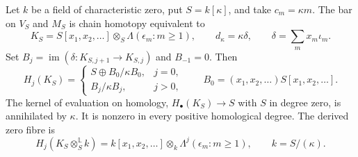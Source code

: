 \begin{theorem}
\label{mbh:thm:family}
Let \(k\) be a field of characteristic zero, put \(S=k[\kappa]\),
and take \(c_m=\kappa m\).  The bar on \(V_S\) and \(M_S\)
is chain homotopy equivalent to
\begin{equation}\label{mbh:eq:family-complex}
 K_S=S[x_1,x_2,\ldots]\otimes_S\Lambda(\epsilon_m:m\ge1),
 \qquad d_\kappa=\kappa\delta,\qquad
 \delta=\sum_m x_m\iota_m.
\end{equation}
Set \(B_j=\operatorname{im}(\delta:K_{S,j+1}\to K_{S,j})\)
and \(B_{-1}=0\).  Then
\begin{equation}\label{mbh:eq:family-homology}
 H_j(K_S)=
 \begin{cases}
 S\oplus B_0/\kappa B_0,&j=0,\\
 B_j/\kappa B_j,&j>0,
 \end{cases}
 \qquad
 B_0=(x_1,x_2,\ldots)S[x_1,x_2,\ldots].
\end{equation}
The kernel of evaluation on homology,
\(H_\bullet(K_S)\to S\) with \(S\) in degree zero, is
annihilated by \(\kappa\).  It is nonzero in every positive
homological degree.
The derived zero fibre is
\begin{equation}\label{mbh:eq:derived-zero}
 H_j(K_S\otimes_S^{\mathbb L}k)
   =k[x_1,x_2,\ldots]\otimes_k\Lambda^j(\epsilon_m:m\ge1),
 \qquad k=S/(\kappa).
\end{equation}
\end{theorem}

